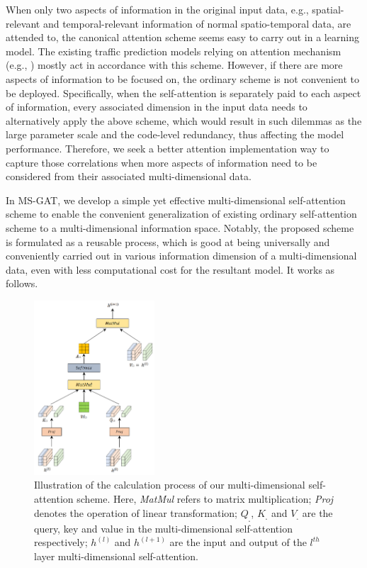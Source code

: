 When only two aspects of information in the original input data, e.g., spatial-relevant and temporal-relevant information of normal spatio-temporal data, are attended to, the canonical attention scheme seems easy to carry out in a learning model. The existing traffic prediction models relying on attention mechanism (e.g., \cite{guo2019attention,zheng2020gman}) mostly act in accordance with this scheme. However, if there are more aspects of information to be focused on, the ordinary scheme is not convenient to be deployed. Specifically, when the self-attention is separately paid to each aspect of information, every associated dimension in the input data needs to alternatively apply the above scheme, which would result in such dilemmas as the large parameter scale and the code-level redundancy, thus affecting the model performance. Therefore, we seek a better attention implementation way to capture those correlations when more aspects of information need to be considered from their associated multi-dimensional data.

In MS-GAT, we develop a simple yet effective multi-dimensional self-attention scheme to enable the convenient generalization of existing ordinary self-attention scheme to a multi-dimensional information space. Notably, the proposed scheme is formulated as a reusable process, which is good at being universally and conveniently carried out in various information dimension of a multi-dimensional data, even with less computational cost for the resultant model. It works as follows.

\begin{figure}[!ht]
    \centering
    \includegraphics[width=0.4\textwidth]{pictures/Multidim_Attention.png}
    \caption{Illustration of the calculation process of our multi-dimensional self-attention scheme. Here, \textit{MatMul} refers to matrix multiplication; \textit{Proj} denotes the operation of linear transformation; $Q_{_\square}$, $K_{_\square}$ and $V_{_\square}$ are the query, key and value in the multi-dimensional self-attention respectively; $h^{(l)}$ and $h^{(l+1)}$ are the input and output of the $l^{th}$ layer multi-dimensional self-attention. }
    \label{fig:multidim_attention}
\end{figure}

